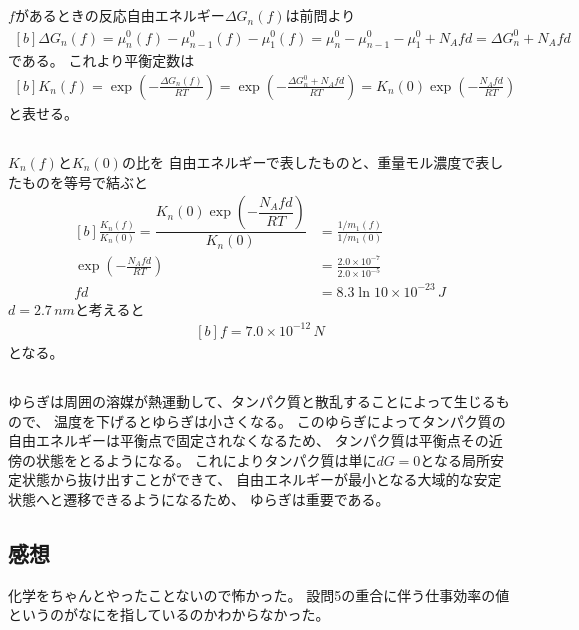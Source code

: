 \documentclass[../../sp_2013.tex]{subfiles}
\begin{document}
\subsection{}
\(f\)があるときの反応自由エネルギー\(\Delta G_n(f)\)は前問より
\begin{equation}\begin{aligned}[b]
    \Delta G_n(f) = \mu_{n}^0(f) -\mu_{n-1}^0(f) -\mu_1^0(f)
    = \mu_{n}^0 -\mu_{n-1}^0 -\mu_1^0 +N_Afd
    = \Delta G_n^0 + N_Afd
\end{aligned}\end{equation}
である。
これより平衡定数は
\begin{equation}\begin{aligned}[b]
    K_n(f) = \exp(-\frac{\Delta G_n(f)}{RT})
    = \exp(-\frac{\Delta G_n^0 + N_Afd}{RT})
    = K_n(0)\exp(-\frac{N_Afd}{RT})
\end{aligned}\end{equation}
と表せる。

\subsection{}
\(K_n(f)\)と\(K_n(0)\)の比を
自由エネルギーで表したものと、重量モル濃度で表したものを等号で結ぶと
\begin{equation}\begin{aligned}[b]
    \frac{K_n(f)}{K_n(0)} = \dfrac{K_n(0)\exp(-\dfrac{N_Afd}{RT})}{K_n(0)}
    &= \frac{1/m_1(f)}{1/m_1(0)}\\
    \exp(-\frac{N_Afd}{RT}) &= \frac{2.0\times 10^{-7}}{2.0\times 10^{-5}}\\
    fd &= 8.3\ln10 \times 10^{-23} \,\si{J}
\end{aligned}\end{equation}
\(d=2.7 \,\si{nm}\)と考えると
\begin{equation}\begin{aligned}[b]
    f = 7.0\times 10^{-12}\,\si{N}
\end{aligned}\end{equation}
となる。

\subsection{}
ゆらぎは周囲の溶媒が熱運動して、タンパク質と散乱することによって生じるもので、
温度を下げるとゆらぎは小さくなる。
このゆらぎによってタンパク質の自由エネルギーは平衡点で固定されなくなるため、
タンパク質は平衡点その近傍の状態をとるようになる。
これによりタンパク質は単に\(dG=0\)となる局所安定状態から抜け出すことができて、
自由エネルギーが最小となる大域的な安定状態へと遷移できるようになるため、
ゆらぎは重要である。

\subsection*{感想}
化学をちゃんとやったことないので怖かった。
設問5の重合に伴う仕事効率の値というのがなにを指しているのかわからなかった。
\end{document}
